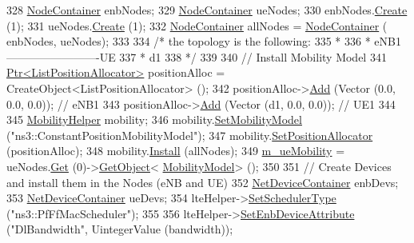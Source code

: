 \begin{DoxyCode}
328   \hyperlink{classns3_1_1NodeContainer}{NodeContainer} enbNodes;
329   \hyperlink{classns3_1_1NodeContainer}{NodeContainer} ueNodes;
330   enbNodes.\hyperlink{classns3_1_1NodeContainer_a787f059e2813e8b951cc6914d11dfe69}{Create} (1);
331   ueNodes.\hyperlink{classns3_1_1NodeContainer_a787f059e2813e8b951cc6914d11dfe69}{Create} (1);
332   \hyperlink{classns3_1_1NodeContainer}{NodeContainer} allNodes = \hyperlink{classns3_1_1NodeContainer}{NodeContainer} ( enbNodes, ueNodes);
333 
334 \textcolor{comment}{/*   the topology is the following:}
335 \textcolor{comment}{ *}
336 \textcolor{comment}{ *   eNB1-------------------------UE}
337 \textcolor{comment}{ *                  d1}
338 \textcolor{comment}{ */}
339 
340   \textcolor{comment}{// Install Mobility Model}
341   \hyperlink{classns3_1_1Ptr}{Ptr<ListPositionAllocator>} positionAlloc = CreateObject<ListPositionAllocator> 
      ();
342   positionAlloc->\hyperlink{classns3_1_1ListPositionAllocator_a460e82f015ac012a73ba0ea0cccb3486}{Add} (Vector (0.0, 0.0, 0.0));                  \textcolor{comment}{// eNB1}
343   positionAlloc->\hyperlink{classns3_1_1ListPositionAllocator_a460e82f015ac012a73ba0ea0cccb3486}{Add} (Vector (d1, 0.0, 0.0));           \textcolor{comment}{// UE1}
344 
345   \hyperlink{classns3_1_1MobilityHelper}{MobilityHelper} mobility;
346   mobility.\hyperlink{classns3_1_1MobilityHelper_a030275011b6f40682e70534d30280aba}{SetMobilityModel} (\textcolor{stringliteral}{"ns3::ConstantPositionMobilityModel"});
347   mobility.\hyperlink{classns3_1_1MobilityHelper_ac59d5295076be3cc11021566713a28c5}{SetPositionAllocator} (positionAlloc);
348   mobility.\hyperlink{classns3_1_1MobilityHelper_a07737960ee95c0777109cf2994dd97ae}{Install} (allNodes);
349   \hyperlink{classLteUplinkPowerControlTestCase_a0b8bf35679af00783442c2e310b30e45}{m\_ueMobility} = ueNodes.\hyperlink{classns3_1_1NodeContainer_a9ed96e2ecc22e0f5a3d4842eb9bf90bf}{Get} (0)->\hyperlink{classns3_1_1Object_a13e18c00017096c8381eb651d5bd0783}{GetObject}<
      \hyperlink{classns3_1_1MobilityModel}{MobilityModel}> ();
350 
351   \textcolor{comment}{// Create Devices and install them in the Nodes (eNB and UE)}
352   \hyperlink{classns3_1_1NetDeviceContainer}{NetDeviceContainer} enbDevs;
353   \hyperlink{classns3_1_1NetDeviceContainer}{NetDeviceContainer} ueDevs;
354   lteHelper->\hyperlink{classns3_1_1LteHelper_a8f86e55b8b80a81732c4b2df00fb25d5}{SetSchedulerType} (\textcolor{stringliteral}{"ns3::PfFfMacScheduler"});
355 
356   lteHelper->\hyperlink{classns3_1_1LteHelper_ac42f0f3d6cd8473d810bfbbeb5d592e0}{SetEnbDeviceAttribute} (\textcolor{stringliteral}{"DlBandwidth"}, UintegerValue (bandwidth));

\end{DoxyCode}
